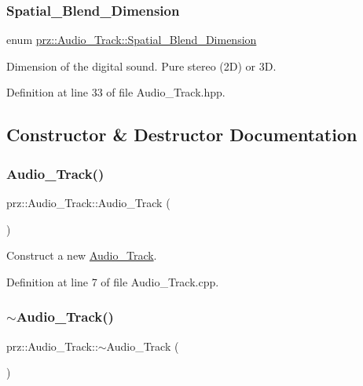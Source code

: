 \subsubsection{\texorpdfstring{Spatial\_Blend\_Dimension}{Spatial\_Blend\_Dimension}}
{\footnotesize\ttfamily enum \mbox{\hyperlink{classprz_1_1_audio___track_a4fb1dc3dd45713ba4c3e56918721d12a}{prz\+::\+Audio\+\_\+\+Track\+::\+Spatial\+\_\+\+Blend\+\_\+\+Dimension}}}



Dimension of the digital sound. Pure stereo (2D) or 3D. 



Definition at line 33 of file Audio\+\_\+\+Track.\+hpp.



\subsection{Constructor \& Destructor Documentation}
\mbox{\label{classprz_1_1_audio___track_ad37bc5741cd0823f8f9277d00a81f50f}} 
\subsubsection{\texorpdfstring{Audio\_Track()}{Audio\_Track()}}
{\footnotesize\ttfamily prz\+::\+Audio\+\_\+\+Track\+::\+Audio\+\_\+\+Track (\begin{DoxyParamCaption}{ }\end{DoxyParamCaption})}



Construct a new \mbox{\hyperlink{classprz_1_1_audio___track}{Audio\+\_\+\+Track}}. 



Definition at line 7 of file Audio\+\_\+\+Track.\+cpp.

\mbox{\label{classprz_1_1_audio___track_a32d24bf61b957d9d5e483eb4c4fbf5c2}} 
\subsubsection{\texorpdfstring{$\sim$Audio\_Track()}{~Audio\_Track()}}
{\footnotesize\ttfamily prz\+::\+Audio\+\_\+\+Track\+::$\sim$\+Audio\+\_\+\+Track (\begin{DoxyParamCaption}{ }\end{DoxyParamCaption})}



